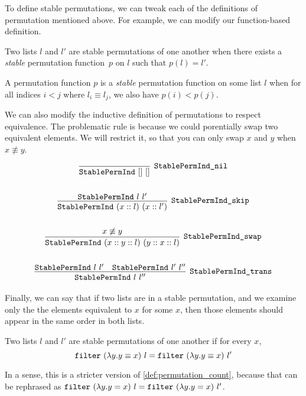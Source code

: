 \documentclass[sigplan,10pt,anonymous,review]{thesis}
\begin{document}
To define stable permutations, we can tweak each of the definitions of
permutation mentioned above. For example, we can modify our
function-based definition.

\begin{definition}[StablePermEx]
  Two lists $l$ and $l'$ are stable permutations of one another when
  there exists a \textit{stable} permutation function~$p$ on $l$ such
  that $p(l) = l'$.
\end{definition}

\begin{definition}[StablePermFun]
  A permutation function $p$ is a \textit{stable} permutation function
  on some list $l$ when for all indices $i < j$ where $l_i \equiv l_j$, we
  also have $p(i) < p(j)$.
\end{definition}

We can also modify the inductive definition of permutations to respect
equivalence. The problematic rule is  because we could
porentially swap two equivalent elements. We will restrict it, so that
you can only swap $x$ and $y$ when $x \nequiv y$.

\begin{definition}[StablePermInd]
  \begin{gather*}
    \infer[\var{StablePermInd\_nil}]{\var{StablePermInd}~[]~[]}{}
    \\ \\
    \infer[\var{StablePermInd\_skip}]{\var{StablePermInd}~(x :: l)~(x :: l')}{%
      \var{StablePermInd}~l~l'
    }
    \\ \\
    \infer[\var{StablePermInd\_swap}]
          {\var{StablePermInd}~(x :: y :: l)~(y :: x :: l)}
          {x \not\equiv y}
    \\ \\
    \infer[\var{StablePermInd\_trans}]{\var{StablePermInd}~l~l''}{
      \var{StablePermInd}~l~l' & \var{StablePermInd}~l'~l''
    }
  \end{gather*}
\end{definition}

Finally, we can say that if two lists are in a stable permutation, and
we examine only the the elements equivalent to $x$ for some $x$, then
those elements should appear in the same order in both lists.
\begin{definition}[StablePerm]
\item Two lists $l$ and $l'$ are stable permutations of one another if
  for every $x$,
  \begin{equation*}
    \texttt{\textup{filter}}~(\lambda y. y \equiv x)~l = \texttt{\textup{filter}}~(\lambda y. y \equiv x)~l'
  \end{equation*}
\end{definition}
In a sense, this is a stricter version of
\cref{def:permutation_count}, because that can be rephrased as
$\texttt{\textup{filter}}~(\lambda y. y = x)~l = \texttt{\textup{filter}}~(\lambda y. y = x)~l'$.
\end{document}

